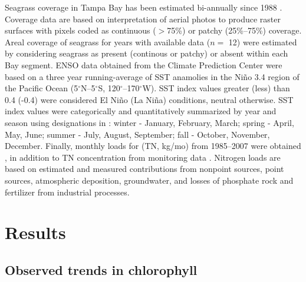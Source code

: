 \documentclass[letterpaper,12pt,oneside]{article}\usepackage{graphicx, color}
\begin{document}
Seagrass coverage in Tampa Bay has been estimated bi-annually since 1988 \citep{Tomasko05}.  Coverage data are based on interpretation of aerial photos to produce raster surfaces with pixels coded as continuous ($>$75\%) or patchy (25\%--75\%) coverage.  Areal coverage of seagrass for years with available data ($n=$ 12) were estimated by considering seagrass as present (continous or patchy) or absent within each Bay segment.  \ac{ENSO} data obtained from the Climate Prediction Center  were based on a three year running-average of \ac{SST} anamolies in the Ni\~{n}o 3.4 region of the Pacific Ocean (5$^{\circ}$N--5$^{\circ}$S, 120$^{\circ}$--170$^{\circ}$W).  \ac{SST} index values greater (less) than 0.4 (-0.4) were considered El Ni\~{n}o (La Ni\~{n}a) conditions, neutral otherwise.  \ac{SST} index values were categorically and quantitatively summarized by year and season using designations in \citet{Lipp01}: winter - January, February, March; spring - April, May, June; summer - July, August, September; fall - October, November, December.  Finally, monthly loads for  (\acs{TN}, kg/mo) from 1985--2007 were obtained \citep{Zarbock94,Pribble01,Poe05}, in addition to \ac{TN} concentration from monitoring data .  Nitrogen loads are based on estimated and measured contributions from nonpoint sources, point sources, atmospheric deposition, groundwater, and losses of phosphate rock and fertilizer from industrial processes.

\section{Results}

\subsection{Observed trends in chlorophyll}
\end{document}
